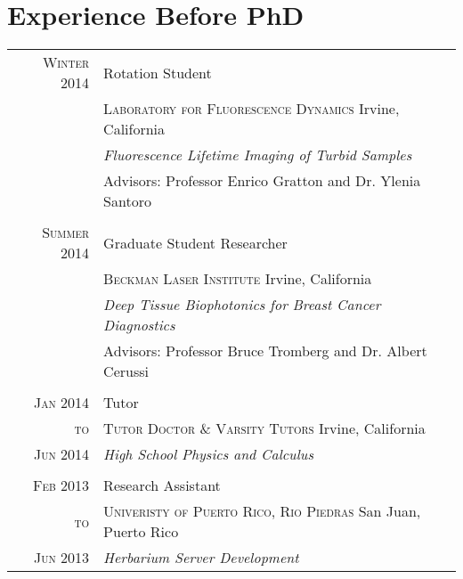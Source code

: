 \documentclass[letterpaper,10pt]{article} %
\begin{document}

\section{Experience Before PhD}
\bigskip

\begin{tabular}{r|p{11cm}}

\textsc{Winter 2014} & Rotation Student \\
& \textsc{Laboratory for Fluorescence Dynamics} Irvine, California\\
&\emph{Fluorescence Lifetime Imaging of Turbid Samples}\\
& Advisors: Professor Enrico Gratton and Dr. Ylenia Santoro \\

\multicolumn{2}{c}{} \\


\textsc{Summer 2014} & Graduate Student Researcher \\
& \textsc{Beckman Laser Institute} Irvine, California\\
&\emph{Deep Tissue Biophotonics for Breast Cancer Diagnostics}\\ 
& Advisors: Professor Bruce Tromberg and Dr. Albert Cerussi \\

\multicolumn{2}{c}{} \\


\textsc{Jan 2014} & Tutor \\
\textsc{to} & \textsc{Tutor Doctor \& Varsity Tutors} Irvine, California\\
\textsc{Jun 2014} &\emph{High School Physics and Calculus}\\ 

\multicolumn{2}{c}{} \\


\textsc{Feb 2013} & Research Assistant  \\
\textsc{to} & \textsc{Univeristy of Puerto Rico, Rio Piedras} San Juan, Puerto Rico\\
\textsc{Jun 2013} & \emph{Herbarium Server Development}\\ 


\end{tabular}
\end{document}
